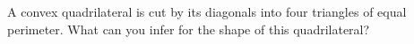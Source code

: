 A convex quadrilateral is cut by its diagonals into four triangles of equal perimeter. What can you infer for the shape of this quadrilateral?
